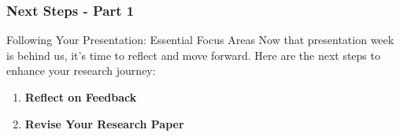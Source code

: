 \documentclass[aspectratio=169]{beamer}
\begin{document}
\begin{frame}[fragile]
    \frametitle{Next Steps - Part 1}
    
    \begin{block}{Following Your Presentation: Essential Focus Areas}
        Now that presentation week is behind us, it’s time to reflect and move forward. Here are the next steps to enhance your research journey:
    \end{block}
    
    \begin{enumerate}
        \item \textbf{Reflect on Feedback}
        \item \textbf{Revise Your Research Paper}
    \end{enumerate}
\end{frame}
\end{document}
